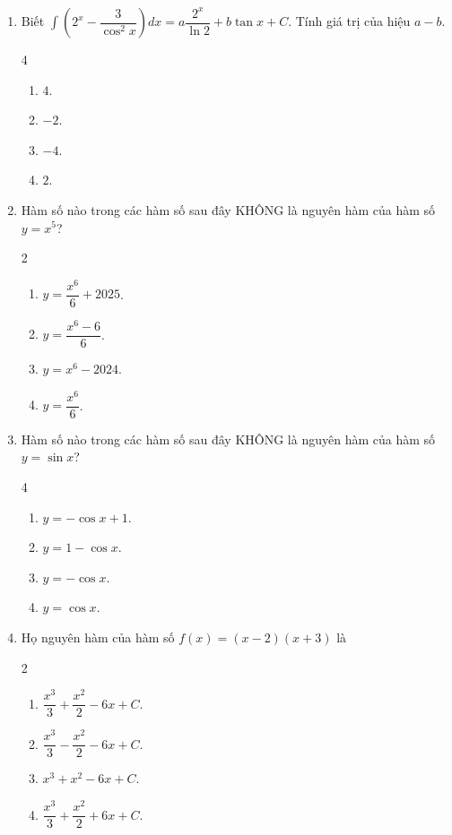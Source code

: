 \documentclass[12pt]{article}
\begin{document}
\begin{enumerate}[label=\textbf{Câu \arabic*.}]
		\item Biết $\displaystyle \int \left( 2^x - \dfrac{3}{\cos^2 x} \right) dx = a \dfrac{2^x}{\ln 2} + b\tan x + C$. Tính giá trị của hiệu $a - b$.
		\begin{multicols}{4}
			\begin{enumerate}[label=\textbf{\Alph*.}]
				\item $4$.
				\item $-2$.
				\item $-4$.
				\item $2$.
			\end{enumerate}
		\end{multicols}
		
		\item Hàm số nào trong các hàm số sau đây KHÔNG là nguyên hàm của hàm số $y = x^5$?
		\begin{multicols}{2}
			\begin{enumerate}[label=\textbf{\Alph*.}]
				\item $y = \dfrac{x^6}{6} + 2025$.
				\item $y = \dfrac{x^6 - 6}{6}$.
				\item $y = x^6 - 2024$.
				\item $y = \dfrac{x^6}{6}$.
			\end{enumerate}
		\end{multicols}
		
		\item Hàm số nào trong các hàm số sau đây KHÔNG là nguyên hàm của hàm số $y = \sin x$?
		\begin{multicols}{4}
			\begin{enumerate}[label=\textbf{\Alph*.}]
				\item $y = -\cos x + 1$.
				\item $y = 1 - \cos x$.
				\item $y = -\cos x$.
				\item $y = \cos x$.
			\end{enumerate}
		\end{multicols}
		
		\item Họ nguyên hàm của hàm số $f(x) = (x - 2)(x + 3)$ là
		\begin{multicols}{2}
			\begin{enumerate}[label=\textbf{\Alph*.}]
				\item $\dfrac{x^3}{3} + \dfrac{x^2}{2} - 6x + C$.
				\item $\dfrac{x^3}{3} - \dfrac{x^2}{2} - 6x + C$.
				\item $x^3 + x^2 - 6x + C$.
				\item $\dfrac{x^3}{3} + \dfrac{x^2}{2} + 6x + C$.
			\end{enumerate}
		\end{multicols}
		

\end{enumerate}
\end{document}
